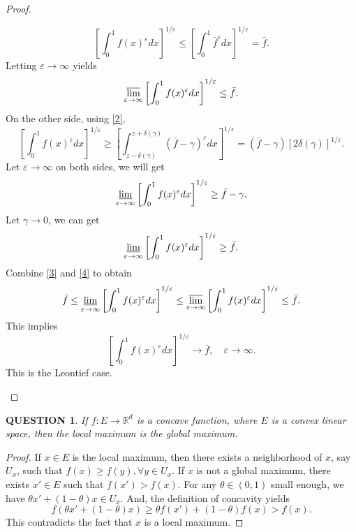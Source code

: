 \documentclass[12pt]{article}
\renewcommand{\(}{\left(}%
\renewcommand{\)}{\right)}%
\renewcommand{\[}{\left[}%
\renewcommand{\]}{\right]}%
\renewcommand{\r}{\mathbb{R}}
\newtheorem{question}{QUESTION}[section]}
\newtheorem{proof}{Proof.}}
\begin{document}
\begin{proof}
\begin{enumerate}[(1)]
\begin{equation*}
  			\[\int_0^1 f(x)^\varepsilon dx\]^{1/\varepsilon}\leq \[\int_0^1 \bar{f}^\varepsilon dx\]^{1/\varepsilon}=\bar{f}.
  		\end{equation*}
  		Letting $\varepsilon\to \infty$ yields
  		\begin{equation}\label{3}
  			\varlimsup_{\varepsilon\to\infty}\[\int_0^1 f(x)^\varepsilon dx\]^{1/\varepsilon}\leq \bar{f}.
  		\end{equation}
  		On the other side, using \eqref{2},
  		\begin{equation*}
  			\[\int_0^1 f(x)^\varepsilon dx\]^{1/\varepsilon}\geq \[\int_{z-\delta(\gamma)}^{z+\delta(\gamma)} (\bar{f}-\gamma)^\varepsilon dx\]^{1/\varepsilon} =(\bar{f}-\gamma) [2\delta(\gamma)]^{1/\varepsilon}.
  		\end{equation*}
  		Let $\varepsilon\to\infty$ on both sides, we will get
  		\begin{equation*}
  			\varliminf_{\varepsilon\to\infty}\[\int_0^1 f(x)^\varepsilon dx\]^{1/\varepsilon}\geq \bar{f}-\gamma.
  		\end{equation*}
  		Let $\gamma\to 0$, we can get 
  		\begin{equation}\label{4}
  			\varliminf_{\varepsilon\to\infty}\[\int_0^1 f(x)^\varepsilon dx\]^{1/\varepsilon}\geq \bar{f}.
  		\end{equation}
		Combine \eqref{3} and \eqref{4} to obtain
		\begin{equation*}
			\bar{f}\leq \varliminf_{\varepsilon\to\infty}\[\int_0^1 f(x)^\varepsilon dx\]^{1/\varepsilon}\leq \varlimsup_{\varepsilon\to\infty}\[\int_0^1 f(x)^\varepsilon dx\]^{1/\varepsilon}\leq \bar{f}.
		\end{equation*}
		This implies 
		\begin{equation*}
			\[\int_0^1 f(x)^\varepsilon dx\]^{1/\varepsilon}\to \bar{f},\quad \varepsilon\to\infty.
		\end{equation*}
		This is the Leontief case.
  	\end{enumerate}
  \end{proof}
  
  \begin{question}
  	If $f:E\to \r^d$ is a concave function, where $E$ is a convex linear space, then the local maximum is the global maximum.
  \end{question}
  \begin{proof}
  	If $x\in E$ is the local maximum, then there exists a neighborhood of $x$, say $U_x$, such that $f(x)\geq f(y),\forall y\in U_x$. If $x$ is not a global maximum, there exists $x'\in E$ such that $f(x')>f(x)$. For any $\theta\in (0,1)$ small enough, we have $\theta x'+(1-\theta)x\in U_x$. And, the definition of concavity yields
  	\begin{equation*}
  		f(\theta x'+(1-\theta)x)\geq \theta f(x')+(1-\theta)f(x)>f(x).
  	\end{equation*}
  	This contradicts the fact that $x$ is a local maximum.
  \end{proof}
  
\end{document}
